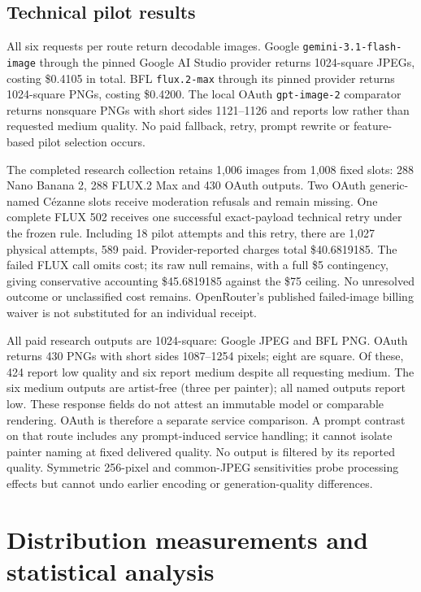 \documentclass[11pt]{article}
\begin{document}
\subsection{Technical pilot results}
All six requests per route return decodable images. Google
\texttt{gemini-3.1-flash-image} through the pinned Google AI Studio provider
returns 1024-square JPEGs, costing \$0.4105 in total. BFL \texttt{flux.2-max}
through its pinned provider returns 1024-square PNGs, costing \$0.4200.
The local OAuth \texttt{gpt-image-2} comparator returns nonsquare PNGs with
short sides 1121--1126 and reports low rather than requested medium quality.
No paid fallback, retry, prompt rewrite or feature-based pilot selection occurs.

The completed research collection retains 1,006 images from 1,008 fixed slots:
288 Nano Banana 2, 288 FLUX.2 Max and 430 OAuth outputs. Two OAuth generic-named
Cézanne slots receive moderation refusals and remain missing. One complete FLUX
502 receives one successful exact-payload technical retry under the frozen rule.
Including 18 pilot attempts and this retry, there are 1,027 physical attempts,
589 paid. Provider-reported charges total \$40.6819185. The failed FLUX call omits
cost; its raw null remains, with a full \$5 contingency, giving conservative
accounting \$45.6819185 against the \$75 ceiling. No unresolved outcome or
unclassified cost remains. OpenRouter's published failed-image billing waiver
\citep{openrouter2026imageapi} is not substituted for an individual receipt.

All paid research outputs are 1024-square: Google JPEG and BFL PNG. OAuth returns
430 PNGs with short sides 1087--1254 pixels; eight are square. Of these, 424 report
low quality and six report medium despite all requesting medium. The six medium
outputs are artist-free (three per painter); all named outputs report low.
These response fields do not attest an immutable model or comparable rendering.
OAuth is therefore a separate service comparison. A prompt contrast on that route
includes any prompt-induced service handling; it cannot isolate painter naming
at fixed delivered quality. No output is filtered by its reported quality.
Symmetric 256-pixel and common-JPEG sensitivities probe processing effects but
cannot undo earlier encoding or generation-quality differences.

\section{Distribution measurements and statistical analysis}
\end{document}
